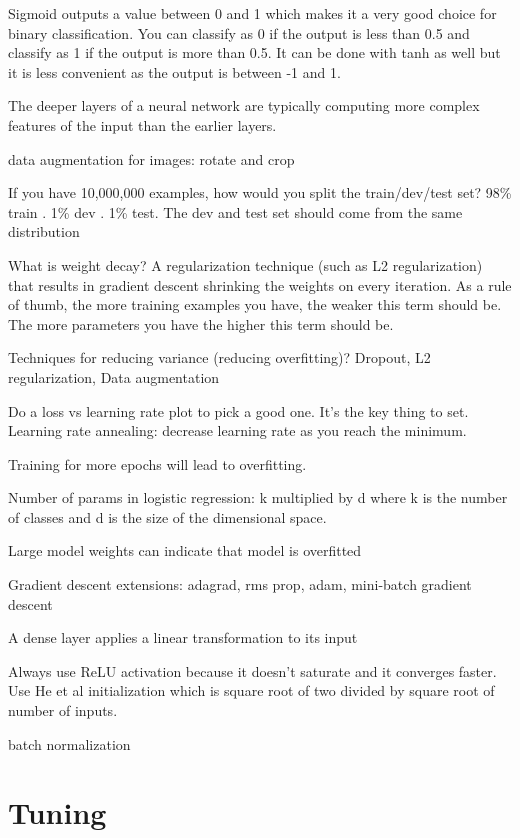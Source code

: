 \documentclass[]{book}
\begin{document}
Sigmoid outputs a value between 0 and 1 which makes it a very good choice for binary classification. You can classify as 0 if the output is less than 0.5 and classify as 1 if the output is more than 0.5. It can be done with tanh as well but it is less convenient as the output is between -1 and 1.

The deeper layers of a neural network are typically computing more complex features of the input than the earlier layers.

data augmentation for images: rotate and crop

If you have 10,000,000 examples, how would you split the train/dev/test set? 98\% train . 1\% dev . 1\% test. The dev and test set should come from the same distribution

What is weight decay? A regularization technique (such as L2 regularization) that results in gradient descent shrinking the weights on every iteration. As a rule of thumb, the more training examples you have, the weaker this term should be. The more parameters you have the higher this term should be.

Techniques for reducing variance (reducing overfitting)? Dropout, L2 regularization, Data augmentation

Do a loss vs learning rate plot to pick a good one. It's the key thing to set. Learning rate annealing: decrease learning rate as you reach the minimum.

Training for more epochs will lead to overfitting.

Number of params in logistic regression: k multiplied by d where k is the number of classes and d is the size of the dimensional space.

Large model weights can indicate that model is overfitted

Gradient descent extensions: adagrad, rms prop, adam, mini-batch gradient descent

A dense layer applies a linear transformation to its input

Always use ReLU activation because it doesn't saturate and it converges faster. Use He et al initialization which is square root of two divided by square root of number of inputs.

batch normalization

\hypertarget{tuning}{%
\section{Tuning}\label{tuning}}
\end{document}
